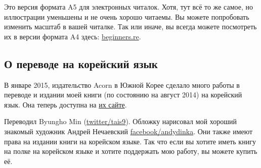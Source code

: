 



\ifdefined\ebook
Это версия формата A5 для электронных читалок.
Хотя, тут всё то же самое, но иллюстрации уменьшены и не очень хорошо читаемы.
Вы можете попробовать изменить масштаб в вашей читалке.
Так или иначе, вы всегда можете посмотреть их в версии формата A4 здесь:
\href{http://go.yurichev.com/17009}{beginners.re}.
\fi

\subsection*{О переводе на корейский язык}

В январе 2015, издательство Acorn в Южной Корее сделало много работы в переводе 
и издании моей книги (по состоянию на август 2014) на корейский язык.
Она теперь доступна на \href{http://go.yurichev.com/17343}{их сайте}.

\iffalse
\begin{figure}[H]
\centering
\texttt{[image: acorn\_cover.jpg]}
\end{figure}
\fi

Переводил Byungho Min (\href{http://go.yurichev.com/17344}{twitter/tais9}).
Обложку нарисовал мой хороший знакомый художник Андрей Нечаевский
\href{http://go.yurichev.com/17023}{facebook/andydinka}.
Они также имеют права на издании книги на корейском языке.
Так что если вы хотите иметь  книгу на полке на корейском языке и
хотите поддержать мою работу, вы можете купить её.
